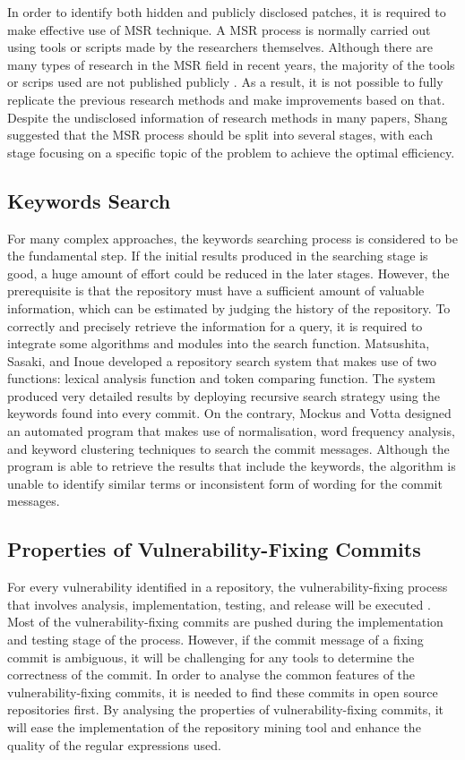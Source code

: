 \documentclass[12pt, a4paper]{report}
\begin{document}
In order to identify both hidden and publicly disclosed patches, it is required to make effective
use of MSR technique. A MSR process is normally carried out using tools or scripts made by the
researchers themselves. Although there are many types of research in the MSR field in recent years,
the majority of the tools or scrips used are not published publicly \cite{robles_2010}. As a result,
it is not possible to fully replicate the previous research methods and make improvements based on
that. Despite the undisclosed information of research methods in many papers, Shang
\cite{shang_2009} suggested that the MSR process should be split into several stages, with each
stage focusing on a specific topic of the problem to achieve the optimal efficiency.

\subsection{Keywords Search}
For many complex approaches, the keywords searching process is considered to be the fundamental
step. If the initial results produced in the searching stage is good, a huge amount of effort could
be reduced in the later stages. However, the prerequisite is that the repository must have a
sufficient amount of valuable information, which can be estimated by judging the history of the
repository. To correctly and precisely retrieve the information for a query, it is required to
integrate some algorithms and modules into the search function. Matsushita, Sasaki, and Inoue
\cite{matsushita_2005} developed a repository search system that makes use of two functions: lexical
analysis function and token comparing function. The system produced very detailed results by
deploying recursive search strategy using the keywords found into every commit. On the contrary,
Mockus and Votta \cite{mockus_2000} designed an automated program that makes use of normalisation,
word frequency analysis, and keyword clustering techniques to search the commit messages. Although
the program is able to retrieve the results that include the keywords, the algorithm is unable to
identify similar terms or inconsistent form of wording for the commit messages.

\subsection{Properties of Vulnerability-Fixing Commits}
For every vulnerability identified in a repository, the vulnerability-fixing process that involves
analysis, implementation, testing, and release will be executed \cite{othmane_2015}. Most of the
vulnerability-fixing commits are pushed during the implementation and testing stage of the process.
However, if the commit message of a fixing commit is ambiguous, it will be challenging for any tools
to determine the correctness of the commit. In order to analyse the common features of the
vulnerability-fixing commits, it is needed to find these commits in open source repositories first.
By analysing the properties of vulnerability-fixing commits, it will ease the implementation of the
repository mining tool and enhance the quality of the regular expressions used.
\end{document}

